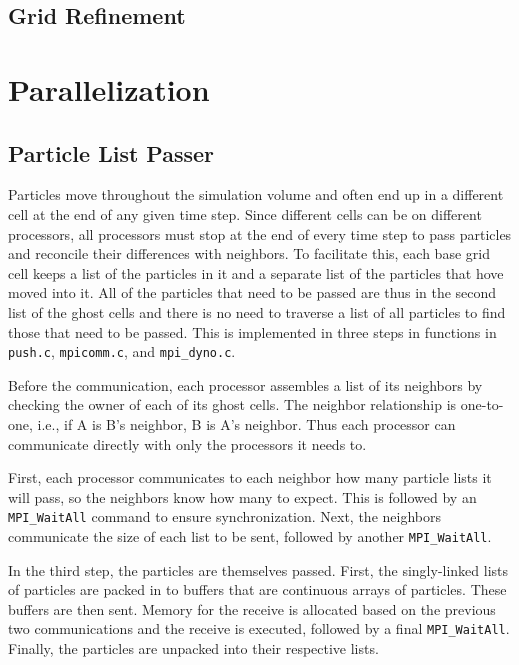 \documentclass[]{article}
\begin{document}
\subsection{Grid Refinement}



\section{Parallelization}

\subsection{Particle List Passer}
Particles move throughout the simulation volume and often end up in a different cell at the end of any given time step.  Since different cells can be on different processors, all processors must stop at the end of every time step to pass particles and reconcile their differences with neighbors.  To facilitate this, each base grid cell keeps a list of the particles in it and a separate list of the particles that hove moved into it.  All of the particles that need to be passed are thus in the second list of the ghost cells and there is no need to traverse a list of all particles to find those that need to be passed.  This is implemented in three steps in functions in \texttt{push.c}, \texttt{mpicomm.c}, and \texttt{mpi\_dyno.c}.

Before the communication, each processor assembles a list of its neighbors by checking the owner of each of its ghost cells.  The neighbor relationship is one-to-one, i.e., if A is B's neighbor, B is A's neighbor.  Thus each processor can communicate directly with only the processors it needs to.

First, each processor communicates to each neighbor how many particle lists it will pass, so the neighbors know how many to expect.  This is followed by an \texttt{MPI\_WaitAll} command to ensure synchronization.  Next, the neighbors communicate the size of each list to be sent, followed by another \texttt{MPI\_WaitAll}.

In the third step, the particles are themselves passed.  First, the singly-linked lists of particles are packed in to buffers that are continuous arrays of particles.  These buffers are then sent.  Memory for the receive is allocated based on the previous two communications and the receive is executed, followed by a final \texttt{MPI\_WaitAll}.  Finally, the particles are unpacked into their respective lists.
\end{document}
